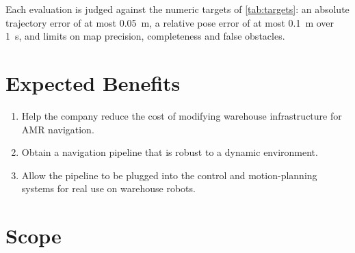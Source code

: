 Each evaluation is judged against the numeric targets of \cref{tab:targets}:
an absolute trajectory error of at most \SI{0.05}{\metre}, a relative pose
error of at most \SI{0.1}{\metre} over \SI{1}{\second}, and limits on map
precision, completeness and false obstacles.

\section{Expected Benefits}
\label{sec:benefits}

\begin{enumerate}[leftmargin=2em]
  \item Help the company reduce the cost of modifying warehouse infrastructure
    for AMR navigation.
  \item Obtain a navigation pipeline that is robust to a dynamic environment.
  \item Allow the pipeline to be plugged into the control and motion-planning
    systems for real use on warehouse robots.
\end{enumerate}

\section{Scope}
\label{sec:scope}

